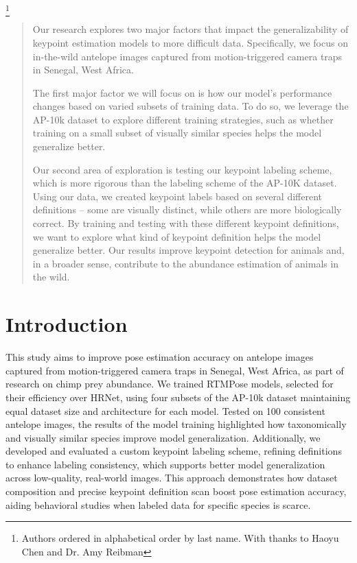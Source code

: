 \documentclass[conference]{IEEEtran}
\begin{document}
\footnote{Authors ordered in alphabetical order by last name. With thanks to Haoyu Chen and Dr. Amy Reibman}
\begin{abstract}
Our research explores two major factors that impact the generalizability of keypoint estimation models to more difficult data. Specifically, we focus on in-the-wild antelope images captured from motion-triggered camera traps in Senegal, West Africa. 

The first major factor we will focus on is how our model’s performance changes based on varied subsets of training data. To do so, we leverage the AP-10k \cite{AP10K} dataset to explore different training strategies, such as whether training on a small subset of visually similar species helps the model generalize better. 

Our second area of exploration is testing our keypoint labeling scheme, which is more rigorous than the labeling scheme of the AP-10K dataset. Using our data, we created keypoint labels based on several different definitions – some are visually distinct, while others are more biologically correct. By training and testing with these different keypoint definitions, we want to explore what kind of keypoint definition helps the model generalize better. Our results improve keypoint detection for animals and, in a broader sense, contribute to the abundance estimation of animals in the wild.

\end{abstract}



\section{Introduction}
This study aims to improve pose estimation accuracy on antelope images captured from motion-triggered camera traps in Senegal, West Africa, as part of research on chimp prey abundance.
We trained RTMPose\cite{rtmpose} models, selected for their efficiency over HRNet\cite{HRNet}, using four subsets of the AP-10k\cite{AP10K} dataset maintaining equal dataset size and architecture for each model. 
Tested on 100 consistent antelope images, the results of the model training highlighted how taxonomically and visually similar species improve model generalization. 
Additionally, we developed and evaluated a custom keypoint labeling scheme, refining definitions to enhance labeling consistency, which supports better model generalization across low-quality, real-world images. 
This approach demonstrates how dataset composition and precise keypoint definition scan boost pose estimation accuracy, aiding behavioral studies when labeled data for specific species is scarce.
\end{document}
